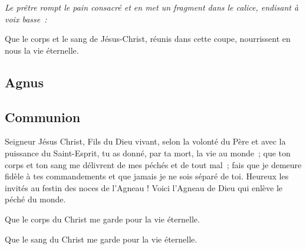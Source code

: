 \emph{Le prêtre rompt le pain consacré et en met un fragment dans le            
calice, endisant à voix basse~:}

Que le corps et le sang de Jésus-Christ, réunis dans cette coupe,
nourrissent en nous la vie éternelle.

\subsection{Agnus}



\subsection{Communion}


Seigneur Jésus Christ, Fils du Dieu vivant, selon la volonté du Père
et avec la puissance du Saint-Esprit, tu as donné, par ta mort, la vie
au monde~; que ton corps et ton sang me délivrent de mes péchés et de
tout mal~; fais que je demeure fidèle à tes commandements et que
jamais je ne sois séparé de toi.
Heureux les invités au festin des noces de l'Agneau !
Voici l'Agneau de Dieu qui enlève le péché du monde.


Que le corps du Christ me garde pour la vie éternelle.

Que le sang du Christ me garde pour la vie éternelle.



